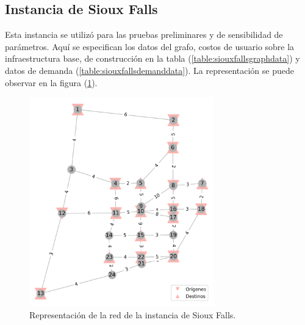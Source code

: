 \documentclass{article}
\begin{document}
  \subsection{Instancia de Sioux Falls}

  Esta instancia se utilizó para las pruebas preliminares y de sensibilidad de parámetros. Aquí se especifican los datos del grafo, costos de usuario sobre la infraestructura base, de construcción en la tabla (\ref{table:siouxfallsgraphdata}) y datos de demanda (\ref{table:siouxfallsdemanddata}). La representación se puede observar en la figura (\ref{fig:siouxfallsapendix}).

  \begin{figure}[h!]
    \centering
    \includegraphics[width=8cm]{../resources/sioux_falls_odpairs.png}
    \caption{Representación de la red de la instancia de Sioux Falls.}
    \label{fig:siouxfallsapendix}
  \end{figure}
\end{document}
